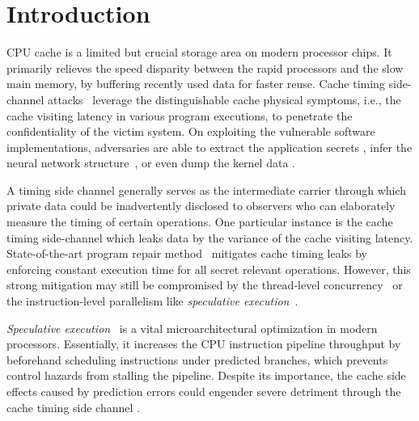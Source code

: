\documentclass[sigconf]{acmart}
\begin{document}
\section{Introduction}
\label{sec:intro}



CPU cache is a limited but crucial storage area on modern processor chips. 
It primarily relieves the speed disparity between the rapid processors and 
the slow main memory, by buffering recently used data for faster reuse. Cache 
timing side-channel attacks~\cite{Kocher96,DhemKLMQW98} leverage the 
distinguishable cache physical symptoms, i.e., the cache visiting latency 
in various program executions, to penetrate the confidentiality of the victim 
system. On exploiting the vulnerable software implementations, adversaries 
are able to extract the application secrets
\cite{OsvikST06,TromerOS10,GullaschBK11,CGM16}, infer the neural network 
structure~\cite{YanFT18,HuLDLXJDLSX18,HongDKLRKDD18,DudduSRB18}, or even 
dump the kernel data
\cite{HundWH13,LippSGPHFHMKGYH18,KocherGGHHLMPSY19,WeisseVMGKPSSWY18}.


A timing side channel generally serves as the intermediate carrier through
which private data could be inadvertently disclosed to observers who can 
elaborately measure the timing of certain operations. One particular instance 
is the cache timing side-channel which leaks data by the variance of the 
cache visiting latency. State-of-the-art program repair method~\cite{WuGSW18} 
mitigates cache timing leaks by enforcing constant execution time for all 
secret relevant operations. However, this strong mitigation may still be 
compromised by the thread-level concurrency~\cite{GuoWW18} or the 
instruction-level parallelism like \textit{speculative execution}~\cite{kimuraKT1996}.


\textit{Speculative execution}~\cite{kimuraKT1996} is a vital microarchitectural
optimization in modern processors. Essentially, it increases the CPU instruction 
pipeline throughput by beforehand scheduling instructions under predicted branches, 
which prevents control hazards from stalling the pipeline. Despite its importance, 
the cache side effects caused by prediction errors could engender severe detriment 
through the cache timing side channel
\cite{KocherGGHHLMPSY19,BulckMWGKPSWYS18,WeisseVMGKPSSWY18,IslamMBKGES19}. 
\end{document}
